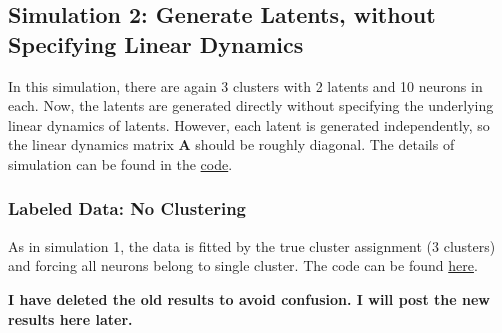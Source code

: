 \documentclass[]{article}
\begin{document}
\subsection{Simulation 2: Generate Latents, without Specifying Linear Dynamics}
In this simulation, there are again 3 clusters with 2 latents and 10 neurons in each. Now, the latents are generated directly without specifying the underlying linear dynamics of latents. However, each latent is generated independently, so the linear dynamics matrix \(\mathbf{A}\) should be roughly diagonal. The details of simulation can be found in the \href{https://github.com/weigcdsb/state-space-clustering/blob/main/LDS/blkDiag/unspecifiedA_sample_blkDiag.m}{code}.

\subsubsection{Labeled Data: No Clustering}
As in simulation 1, the data is fitted by the true cluster assignment (3 clusters) and forcing all neurons belong to single cluster. The code can be found \href{https://github.com/weigcdsb/state-space-clustering/blob/main/LDS/blkDiag/unspecifiedA_sample_blkDiag.m}{here}.


\textbf{I have deleted the old results to avoid confusion. I will post the new results here later.}

%
%
%
\end{document}
